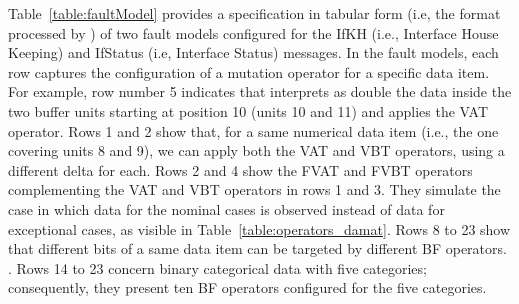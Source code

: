 %



%
%
%
%
%
%



Table~\ref{table:faultModel} provides a specification in tabular form (i.e, the format processed by \APPR) of two fault models configured for the IfKH (i.e., Interface House Keeping) and IfStatus (i.e, Interface Status) messages. In the fault models, each row captures the configuration of a mutation operator for a specific data item. For example, row number 5 indicates that \APPR interprets as double the data inside the two buffer units starting at position 10 (units 10 and 11) and applies the VAT operator. Rows 1 and 2 show that, for a same numerical data item (i.e., the one covering units 8 and 9), we can apply both the VAT and VBT operators, using a different delta for each.
Rows 2 and 4 show the FVAT and FVBT operators complementing the VAT and VBT operators in rows 1 and 3. They simulate the case in which data for the nominal cases is observed instead of data for exceptional cases, as visible in Table~\ref{table:operators_damat}.
Rows 8 to 23 show that different bits of a same data item can be targeted by different BF operators. %
.
Rows 14 to 23 concern binary categorical data with five categories; consequently, they present ten BF operators configured for the five categories.




